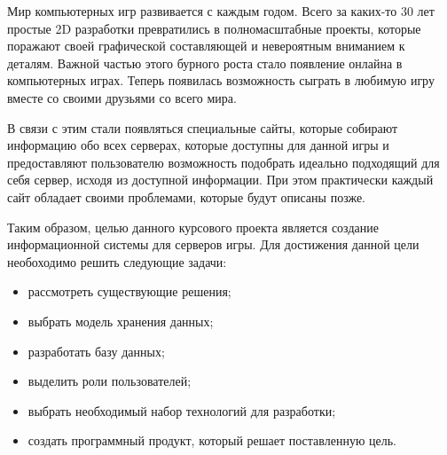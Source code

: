 \intro

Мир компьютерных игр развивается с каждым годом. Всего за каких-то 30 лет простые 2D разработки превратились в полномасштабные проекты, которые поражают своей графической составляющей и невероятным вниманием к деталям. Важной частью этого бурного роста стало появление онлайна в компьютерных играх. Теперь появилась возможность сыграть в любимую игру вместе со своими друзьями со всего мира.

В связи с этим стали появляться специальные сайты, которые собирают информацию обо всех серверах, которые доступны для данной игры и предоставляют пользователю возможность подобрать идеально подходящий для себя сервер, исходя из доступной информации. При этом практически каждый сайт обладает своими проблемами, которые будут описаны позже.

Таким образом, целью данного курсового проекта является создание информационной системы для серверов игры. Для достижения данной цели необоходимо решить следующие задачи:

\begin{itemize}
	\item рассмотреть существующие решения;
	\item выбрать модель хранения данных;
	\item разработать базу данных;
	\item выделить роли пользователей;
	\item выбрать необходимый набор технологий для разработки;
	\item создать программный продукт, который решает поставленную цель.
\end{itemize}
